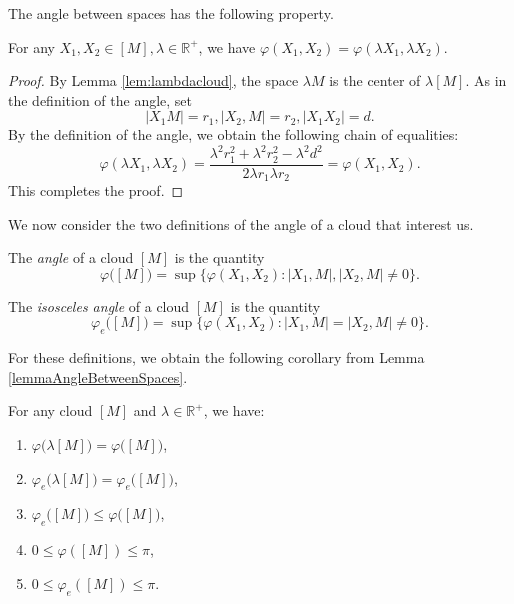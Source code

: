 \documentclass[leqno]{article}
\begin{document}
The angle between spaces has the following property.
\begin{lemma}
    \label{lemmaAngleBetweenSpaces} For any \( X_1, X_2 \in [M], \lambda
    \in\mathbb{R}^+ \), we have \( \varphi (X_1, X_2) = \varphi (\lambda
            X_1,
    \lambda X_2) \).
\end{lemma}
\begin{proof}
    By Lemma \ref{lem:lambdacloud}, the space \( \lambda M \) is the
    center of \( \lambda
        [M]
    \). As in the definition of the angle, set \[ |X_1 M| = r_1, |
        X_2, M | =r_2,
        |X_1
    X_2| = d.\] By the definition of the angle, we obtain the following chain
    of equalities: \[ \varphi (\lambda X_1, \lambda X_2) = \frac{\lambda
        ^{2} r_1^2 + \lambda ^2 r_2^2 - \lambda^2 d^2}{2 \lambda  r_1
        \lambda r_2} =
        \varphi (X_1, X_2).
    \]
    This completes the proof.
\end{proof}
We now consider the two definitions of the angle of a cloud that interest us.
\begin{definition}
    The \emph{angle} of a cloud \( [M] \) is the quantity
    \[
        \varphi \big([M]\big)= \sup \big\{\varphi (X_1, X_2) \colon | X_1,M
        |, |X_2,M| \neq 0\big\}.
    \]
\end{definition}
\begin{definition}
    The \emph{isosceles angle} of a cloud \( [M] \) is the quantity
    \[
        \varphi_e \big([M]\big) = \sup \big\{\varphi (X_1, X_2) \colon |X_1,M |
        = |X_2,M| \neq 0\big\}.
    \]
\end{definition}
For these definitions, we obtain the following corollary from Lemma
\ref{lemmaAngleBetweenSpaces}.
\begin{lemma}
    For any cloud \( [M] \) and \( \lambda \in\mathbb{R}^+ \), we
    have\textup{:}\label{lem:angles}
    \begin{enumerate}
        \item \(\varphi \big(\lambda [M]\big) = \varphi
            \big([M]\big)\),\label{lem:angles:1}
        \item \(\varphi_e \big(\lambda [M]\big) = \varphi_e
            \big([M]\big)\),\label{lem:angles:2}
        \item \( \varphi_e \big([M]\big) \le \varphi \big([M]\big)
            \),\label{lem:angles:3}
        \item \(0 \le \varphi ([M]) \le \pi\),\label{lem:angles:4}
        \item \(0 \le \varphi_e ([M]) \le \pi\).\label{lem:angles:5}
    \end{enumerate}
\end{lemma}
\end{document}

